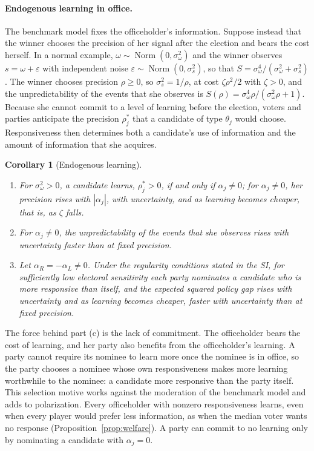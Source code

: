 \documentclass[12pt,letterpaper]{article}
\newtheorem{corollary}{Corollary}
\begin{document}
\paragraph{Endogenous learning in office.}
The benchmark model fixes the officeholder's information. Suppose instead that the winner chooses the precision of her signal after the election and bears the cost herself. In a normal example, $\omega\sim\operatorname{Norm}(0,\sigma_\omega^2)$ and the winner observes $s=\omega+\varepsilon$ with independent noise $\varepsilon\sim\operatorname{Norm}(0,\sigma_s^2)$, so that $S=\sigma_\omega^4/(\sigma_\omega^2+\sigma_s^2)$. The winner chooses precision $\rho\ge0$, so $\sigma_s^2=1/\rho$, at cost $\zeta \rho^2/2$ with $\zeta>0$, and the unpredictability of the events that she observes is $S(\rho)=\sigma_\omega^4\rho/(\sigma_\omega^2\rho+1)$. Because she cannot commit to a level of learning before the election, voters and parties anticipate the precision $\rho_j^*$ that a candidate of type $\theta_j$ would choose. Responsiveness then determines both a candidate's use of information and the amount of information that she acquires.

\begin{corollary}[Endogenous learning]\label{cor:endolearn}
\begin{enumerate}
  \item[(a)] For $\sigma_\omega^2>0$, a candidate learns, $\rho_j^*>0$, if and only if $\alpha_j\ne0$; for $\alpha_j\ne0$, her precision rises with $|\alpha_j|$, with uncertainty, and as learning becomes cheaper, that is, as $\zeta$ falls.
  \item[(b)] For $\alpha_j\ne0$, the unpredictability of the events that she observes rises with uncertainty faster than at fixed precision.
  \item[(c)] Let $\alpha_R=-\alpha_L\ne0$. Under the regularity conditions stated in the SI, for sufficiently low electoral sensitivity each party nominates a candidate who is more responsive than itself, and the expected squared policy gap rises with uncertainty and as learning becomes cheaper, faster with uncertainty than at fixed precision.
\end{enumerate}
\end{corollary}

The force behind part (c) is the lack of commitment. The officeholder bears the cost of learning, and her party also benefits from the officeholder's learning. A party cannot require its nominee to learn more once the nominee is in office, so the party chooses a nominee whose own responsiveness makes more learning worthwhile to the nominee: a candidate more responsive than the party itself. This selection motive works against the moderation of the benchmark model and adds to polarization. Every officeholder with nonzero responsiveness learns, even when every player would prefer less information, as when the median voter wants no response (Proposition~\ref{prop:welfare}). A party can commit to no learning only by nominating a candidate with $\alpha_j=0$.
\end{document}
